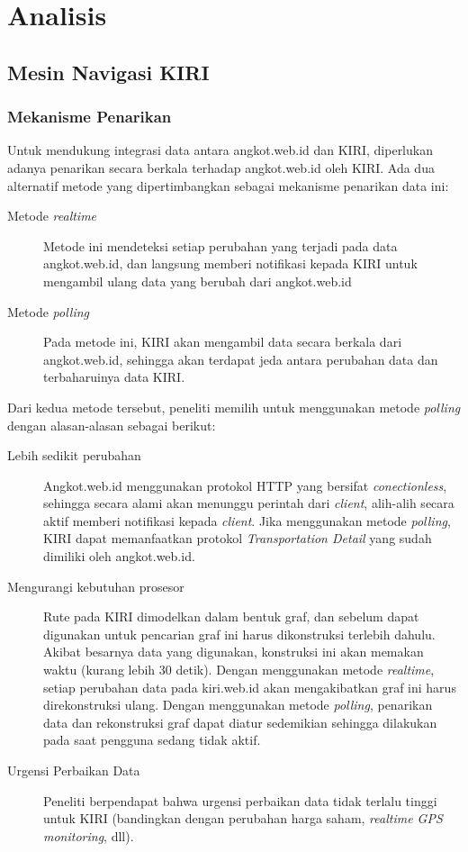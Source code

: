 \chapter{Analisis}

\section{Mesin Navigasi KIRI}

\subsection{Mekanisme Penarikan}

Untuk mendukung integrasi data antara angkot.web.id dan KIRI, diperlukan adanya penarikan secara berkala terhadap angkot.web.id oleh KIRI. Ada dua alternatif metode yang dipertimbangkan sebagai mekanisme penarikan data ini:

\begin{description}
	\item[Metode \textit{realtime}] Metode ini mendeteksi setiap perubahan yang terjadi pada data angkot.web.id, dan langsung memberi notifikasi kepada KIRI untuk mengambil ulang data yang berubah dari angkot.web.id
	\item[Metode \textit{polling}] Pada metode ini, KIRI akan mengambil data secara berkala dari angkot.web.id, sehingga akan terdapat jeda antara perubahan data dan terbaharuinya data KIRI.
\end{description}

Dari kedua metode tersebut, peneliti memilih untuk menggunakan metode \textit{polling} dengan alasan-alasan sebagai berikut:

\begin{description}
	\item[Lebih sedikit perubahan] Angkot.web.id menggunakan protokol HTTP yang bersifat \textit{conectionless}, sehingga secara alami akan menunggu perintah dari \textit{client}, alih-alih secara aktif memberi notifikasi kepada \textit{client}. Jika menggunakan metode \textit{polling}, KIRI dapat memanfaatkan protokol \textit{Transportation Detail} yang sudah dimiliki oleh angkot.web.id.
	\item[Mengurangi kebutuhan prosesor] Rute pada KIRI dimodelkan dalam bentuk graf, dan sebelum dapat digunakan untuk pencarian graf ini harus dikonstruksi terlebih dahulu. Akibat besarnya data yang digunakan, konstruksi ini akan memakan waktu (kurang lebih 30 detik). Dengan menggunakan metode \textit{realtime}, setiap perubahan data pada kiri.web.id akan mengakibatkan graf ini harus direkonstruksi ulang. Dengan menggunakan metode \textit{polling}, penarikan data dan rekonstruksi graf dapat diatur sedemikian sehingga dilakukan pada saat pengguna sedang tidak aktif.
	\item[Urgensi Perbaikan Data] Peneliti berpendapat bahwa urgensi perbaikan data tidak terlalu tinggi untuk KIRI (bandingkan dengan perubahan harga saham, \textit{realtime GPS monitoring}, dll).
\end{description}

